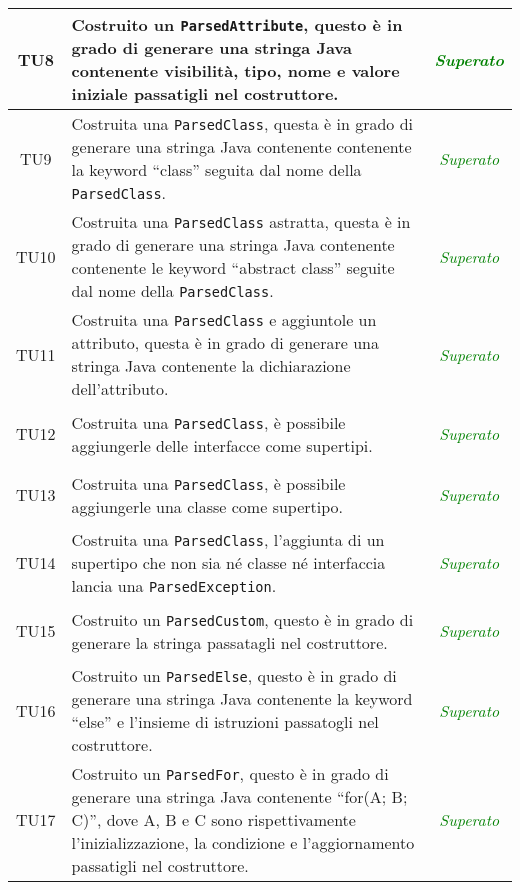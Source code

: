 \begin{longtable}{|c|>{}m{8cm}|c|}
\hypertarget{TU8}{TU8} & Costruito un \texttt{ParsedAttribute}, questo è in grado di generare una stringa Java contenente visibilità, tipo, nome e valore iniziale passatigli nel costruttore. & \textcolor{Green}{\textit{Superato}}\\ \hline
\hypertarget{TU9}{TU9} & Costruita una \texttt{ParsedClass}, questa è in grado di generare una stringa Java contenente contenente la keyword ``class'' seguita dal nome della \texttt{ParsedClass}. & \textcolor{Green}{\textit{Superato}}\\ \hline
\hypertarget{TU10}{TU10} & Costruita una \texttt{ParsedClass} astratta, questa è in grado di generare una stringa Java contenente contenente le keyword ``abstract class'' seguite dal nome della \texttt{ParsedClass}. & \textcolor{Green}{\textit{Superato}}\\ \hline
\hypertarget{TU11}{TU11} & Costruita una \texttt{ParsedClass} e aggiuntole un attributo, questa è in grado di generare una stringa Java contenente la dichiarazione dell'attributo. & \textcolor{Green}{\textit{Superato}}\\ \hline
\hypertarget{TU12}{TU12} & Costruita una \texttt{ParsedClass}, è possibile aggiungerle delle interfacce come supertipi. & \textcolor{Green}{\textit{Superato}}\\ \hline
\hypertarget{TU13}{TU13} & Costruita una \texttt{ParsedClass}, è possibile aggiungerle una classe come supertipo. & \textcolor{Green}{\textit{Superato}}\\ \hline
\hypertarget{TU14}{TU14} & Costruita una \texttt{ParsedClass}, l'aggiunta di un supertipo che non sia né classe né interfaccia lancia una \texttt{ParsedException}. & \textcolor{Green}{\textit{Superato}}\\ \hline
\hypertarget{TU15}{TU15} & Costruito un \texttt{ParsedCustom}, questo è in grado di generare la stringa passatagli nel costruttore. & \textcolor{Green}{\textit{Superato}}\\ \hline
\hypertarget{TU16}{TU16} & Costruito un \texttt{ParsedElse}, questo è in grado di generare una stringa Java contenente la keyword ``else'' e l'insieme di istruzioni passatogli nel costruttore. & \textcolor{Green}{\textit{Superato}}\\ \hline
\hypertarget{TU17}{TU17} & Costruito un \texttt{ParsedFor}, questo è in grado di generare una stringa Java contenente ``for(A; B; C)'', dove A, B e C sono rispettivamente l'inizializzazione, la condizione e l'aggiornamento passatigli nel costruttore. & \textcolor{Green}{\textit{Superato}}\\ \hline

\end{longtable}
